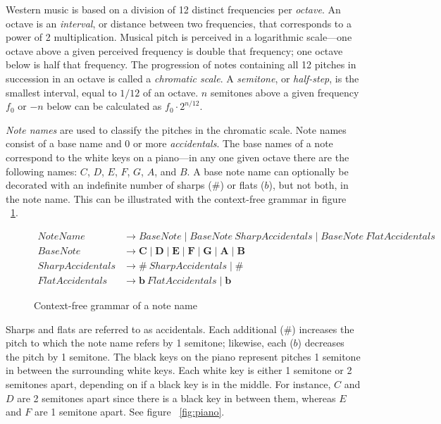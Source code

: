 Western music is based on a division of 12 distinct frequencies per \textit{octave}. An octave is an \textit{interval}, or distance between two frequencies, that corresponds to a power of 2 multiplication. Musical pitch is perceived in a logarithmic scale---one octave above a given perceived frequency is double that frequency; one octave below is half that frequency. The progression of notes containing all 12 pitches in succession in an octave is called a \textit{chromatic scale}. A \textit{semitone}, or \textit{half-step}, is the smallest interval, equal to $1/12$ of an octave. $n$ semitones above a given frequency $f_0$ or $-n$ below can be calculated as $f_0 \cdot 2^{n/12}$.

\textit{Note names} are used to classify the pitches in the chromatic scale. Note names consist of a base name and 0 or more \textit{accidentals}. The base names of a note correspond to the white keys on a piano---in any one given octave there are the following names: $C$, $D$, $E$, $F$, $G$, $A$, and $B$. A base note name can optionally be decorated with an indefinite number of sharps ($\#$) or flats ($b$), but not both, in the note name. This can be illustrated with the context-free grammar in figure ~\ref{fig:cfgnote}.

\begin{figure}[h!]
\begin{center}
\begin{align*}
NoteName &\to BaseNote \mid BaseNote\ SharpAccidentals \mid BaseNote\ FlatAccidentals \\
BaseNote &\to \mathbf{C} \mid \mathbf{D} \mid \mathbf{E} \mid \mathbf{F} \mid \mathbf{G} \mid \mathbf{A} \mid \mathbf{B} \\
SharpAccidentals &\to \mathbf{\#}\ SharpAccidentals \mid \mathbf{\#} \\
FlatAccidentals &\to \mathbf{b}\ FlatAccidentals \mid \mathbf{b}
\end{align*}
\caption{Context-free grammar of a note name}
\label{fig:cfgnote}
\end{center}
\end{figure}


Sharps and flats are referred to as accidentals. Each additional ($\#$) increases the pitch to which the note name refers by 1 semitone; likewise, each ($b$) decreases the pitch by 1 semitone.  The black keys on the piano represent pitches 1 semitone in between the surrounding white keys. Each white key is either 1 semitone or 2 semitones apart, depending on if a black key is in the middle. For instance, $C$ and $D$ are 2 semitones apart since there is a black key in between them, whereas $E$ and $F$ are 1 semitone apart. See figure ~\ref{fig:piano}.
